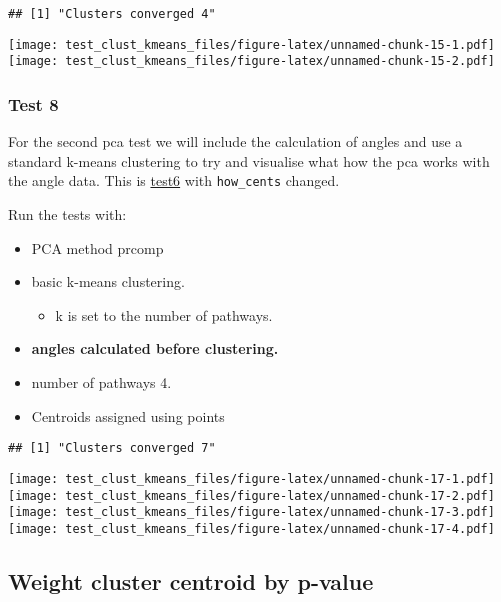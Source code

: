 \documentclass[
]{article}
\providecommand{\tightlist}{%
  \setlength{\itemsep}{0pt}\setlength{\parskip}{0pt}}
\begin{document}
\begin{verbatim}
## [1] "Clusters converged 4"
\end{verbatim}

\texttt{[image: test\_clust\_kmeans\_files/figure-latex/unnamed-chunk-15-1.pdf]}
\texttt{[image: test\_clust\_kmeans\_files/figure-latex/unnamed-chunk-15-2.pdf]}

\hypertarget{test8}{%
\subsubsection{Test 8}\label{test8}}

For the second pca test we will include the calculation of angles and
use a standard k-means clustering to try and visualise what how the pca
works with the angle data. This is \protect\hyperlink{test6}{test6} with
\texttt{how\_cents} changed.

Run the tests with:

\begin{itemize}
\tightlist
\item
  PCA method prcomp
\item
  basic k-means clustering.

  \begin{itemize}
  \tightlist
  \item
    k is set to the number of pathways.
  \end{itemize}
\item
  \textbf{angles calculated before clustering.}
\item
  number of pathways 4.
\item
  Centroids assigned using points
\end{itemize}

\begin{verbatim}
## [1] "Clusters converged 7"
\end{verbatim}

\texttt{[image: test\_clust\_kmeans\_files/figure-latex/unnamed-chunk-17-1.pdf]}
\texttt{[image: test\_clust\_kmeans\_files/figure-latex/unnamed-chunk-17-2.pdf]}
\texttt{[image: test\_clust\_kmeans\_files/figure-latex/unnamed-chunk-17-3.pdf]}
\texttt{[image: test\_clust\_kmeans\_files/figure-latex/unnamed-chunk-17-4.pdf]}

\hypertarget{cluster_p_weight}{%
\subsection{Weight cluster centroid by p-value}\label{cluster_p_weight}}
\end{document}

